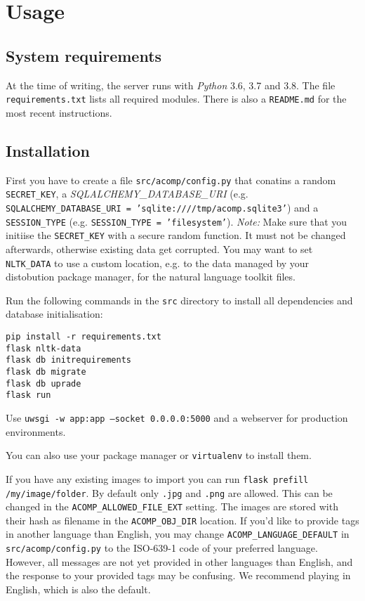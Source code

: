 \section{Usage}
\label{gXLII:sec:usage}  %

\subsection{System requirements}
\label{gXLII:sec:usage:requirements}  %
At the time of writing, the server runs with \textit{Python} 3.6, 3.7 and 3.8. The file
\texttt{requirements.txt} lists all required modules.
There is also a \texttt{README.md} for the most recent instructions.

\subsection{Installation}
\label{gXLII:sec:usage:instllation}  %
First you have to create a file \texttt{src/acomp/config.py} that conatins
a random \texttt{SECRET\_KEY}, a \textit{SQLALCHEMY\_DATABASE\_URI}
(e.g. \texttt{SQLALCHEMY\_DATABASE\_URI = 'sqlite:////tmp/acomp.sqlite3'}) and
a \texttt{SESSION\_TYPE} (e.g. \texttt{SESSION\_TYPE = 'filesystem'}).
\textit{Note:} Make sure that you initiise the \texttt{SECRET\_KEY} with a secure random function.
It must not be changed afterwards, otherwise existing data get corrupted.
You may want to set \texttt{NLTK\_DATA} to use a custom location, e.g. to the data
managed by your distobution package manager, for the natural language toolkit files.

Run the following commands in the \texttt{src} directory to install all dependencies and
database initialisation:

\begin{verbatim}
pip install -r requirements.txt
flask nltk-data
flask db initrequirements
flask db migrate
flask db uprade
flask run
\end{verbatim}

Use \texttt{uwsgi -w app:app --socket 0.0.0.0:5000} and a webserver for production environments.

You can also use your package manager or \texttt{virtualenv} to install them.

If you have any existing images to import you can run
\texttt{flask prefill /my/image/folder}. By default only \texttt{.jpg} and \texttt{.png}
are allowed. This can be changed in the \texttt{ACOMP\_ALLOWED\_FILE\_EXT} setting. The
images are stored with their hash as filename in the \texttt{ACOMP\_OBJ\_DIR} location.
If you'd like to provide tags in another language than English, you may change
\texttt{ACOMP\_LANGUAGE\_DEFAULT} in \texttt{src/acomp/config.py} to the
ISO-639-1  code of your preferred language.
However, all messages are not yet provided in other languages than English,
and the response to your provided tags may be confusing.
We recommend playing in English, which is also the default.

